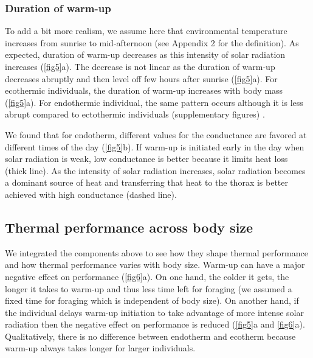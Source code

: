 \subsubsection*{Duration of warm-up}
To add a bit more realism, we assume here that environmental temperature increases from sunrise to mid-afternoon (see Appendix 2 for the definition).
 As expected, duration of warm-up decreases as this intensity of solar radiation increases (\cref{fig5}a).
The decrease is not linear as the duration of  warm-up decreases abruptly and then level off few hours after sunrise (\cref{fig5}a).
For ecothermic individuals, the duration of warm-up increases with body mass (\cref{fig5}a).
For endothermic individual, the same pattern occurs although it is less abrupt compared to ectothermic individuals (supplementary figures) .

We found that for endotherm, different values for the conductance are favored at different times of the day (\cref{fig5}b).
If warm-up is initiated early in the day when solar radiation is weak, low conductance is better because it limits heat loss (thick line).
As the intensity of solar radiation increases, solar radiation becomes a dominant source of heat and transferring that heat to the thorax is better achieved with high conductance (dashed line).

\subsection*{Thermal performance across body size}
 We integrated the components above to see how they shape thermal performance and how thermal performance varies with body size.
Warm-up can have a major negative effect on performance (\cref{fig6}a).
On one hand, the colder it gets, the longer it takes to warm-up and thus less time left for foraging (we assumed a fixed time for foraging which is independent of body size).
On another hand, if the individual delays warm-up initiation to take advantage of more intense solar radiation then the negative effect on performance is reduced (\cref{fig5}a and \cref{fig6}a). %
Qualitatively, there is no difference between endotherm and ecotherm because warm-up always takes longer for larger individuals. 

